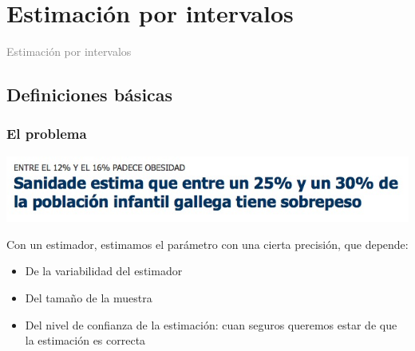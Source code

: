 \documentclass[12pt,t]{beamer}
\title[\red{Matemáticas III GINF}]{}
\author[]{}
\date{}
\newcommand{\gray}[1]{\textcolor{gray}{#1}}
\renewcommand{\emph}[1]{{\color{red}#1}}
\theoremstyle{plain}
\theoremstyle{definition}
\begin{document}

\beamertemplatedotitem

\lstset{breaklines=true}
\lstset{basicstyle=\ttfamily}


\section{Estimación por intervalos}

\begin{frame}
\vfill
\begin{center}
\gray{\LARGE Estimación por intervalos}
\end{center}
\vfill
\end{frame}


\subsection{Definiciones básicas}

\begin{frame}
\frametitle{El problema}
\vspace*{-1cm}

\begin{center}
\hspace*{-0.6cm}
\includegraphics[width=1.1\linewidth]{sanidade}
\end{center}
\vspace*{-1ex}

Con un estimador, estimamos el parámetro con una cierta precisión, que depende:
\medskip

\begin{itemize}
\item De la variabilidad del estimador
\medskip

\item Del tamaño de la muestra
\medskip

\item Del \emph{nivel de confianza} de la  estimación: cuan seguros  queremos estar de que la estimación es correcta
\end{itemize}
\end{frame}
\end{document}
